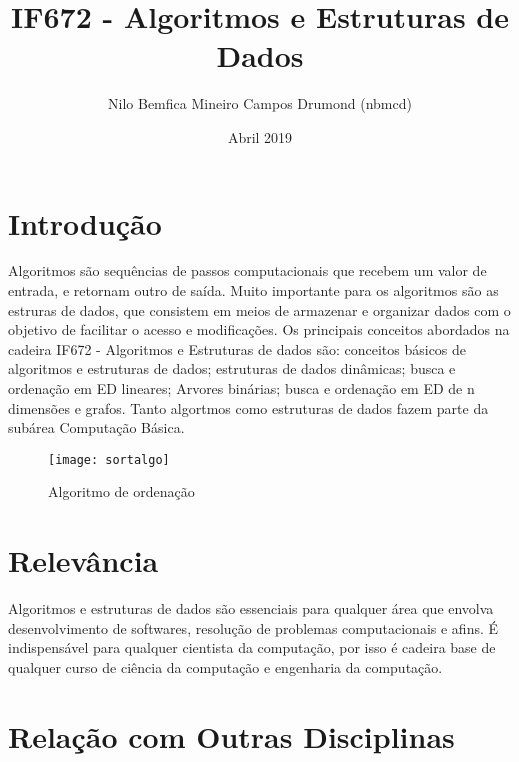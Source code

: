 \documentclass[10pt]{article}
\title{IF672 - Algoritmos e Estruturas de Dados}
\author{Nilo Bemfica Mineiro Campos Drumond (nbmcd)}
\date{Abril 2019}
\begin{document}
\maketitle


\section{Introdução}
Algoritmos são sequências de passos computacionais que recebem um valor de entrada, e retornam outro de saída. Muito importante para os algoritmos são as estruras de dados, que consistem em meios de armazenar e organizar dados com o objetivo de facilitar o acesso e modificações\cite{algo}. Os principais conceitos abordados na cadeira IF672 - Algoritmos e Estruturas de dados são: conceitos básicos de algoritmos e estruturas de dados; estruturas de dados dinâmicas; busca e ordenação em ED lineares; Arvores binárias; busca e ordenação em ED de n dimensões e grafos\cite{cin-if672}. Tanto algortmos como estruturas de dados fazem parte da subárea Computação Básica\cite{subarea}.

\begin{figure}[h!]
\centering
\renewcommand{\figurename}{Figura}
\texttt{[image: sortalgo]}
\caption{Algoritmo de ordenação\cite{imagem}}
\end{figure}

\section{Relevância}
Algoritmos e estruturas de dados são essenciais para qualquer área que envolva desenvolvimento de softwares, resolução de problemas computacionais e afins. É indispensável para qualquer cientista da computação, por isso é cadeira base de qualquer curso de ciência da computação e engenharia da computação.

\section{Relação com Outras Disciplinas\cite{cc}}
\end{document}
